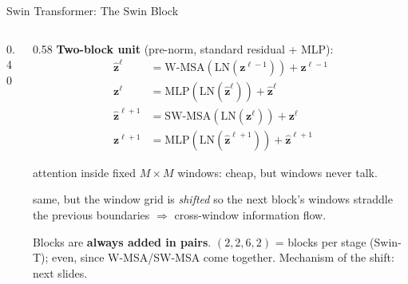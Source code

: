 \begin{frame}[fragile]{Swin Transformer: The Swin Block}
\begin{columns}[T]
\begin{column}{0.40\textwidth}
\begin{center}
      \end{center}
    \end{column}
    \begin{column}{0.58\textwidth}
      \textbf{Two-block unit} (pre-norm, standard residual + MLP):
      \begin{align*}
        \hat{\mathbf{z}}^\ell     &= \text{W-MSA}(\text{LN}(\mathbf{z}^{\ell-1})) + \mathbf{z}^{\ell-1} \\
        \mathbf{z}^\ell           &= \text{MLP}(\text{LN}(\hat{\mathbf{z}}^\ell)) + \hat{\mathbf{z}}^\ell \\
        \hat{\mathbf{z}}^{\ell+1} &= \text{SW-MSA}(\text{LN}(\mathbf{z}^\ell)) + \mathbf{z}^\ell \\
        \mathbf{z}^{\ell+1}       &= \text{MLP}(\text{LN}(\hat{\mathbf{z}}^{\ell+1})) + \hat{\mathbf{z}}^{\ell+1}
      \end{align*}

      \begin{description}[style=nextline, leftmargin=0.4cm]
        \item[W-MSA] attention inside fixed $M{\times}M$ windows: cheap, but windows never talk.
        \item[SW-MSA] same, but the window grid is \emph{shifted} so the next block's windows straddle the previous boundaries $\Rightarrow$ cross-window information flow.
      \end{description}
      Blocks are \textbf{always added in pairs}. $(2,2,6,2)$ = blocks per stage (Swin-T); even, since W-MSA/SW-MSA come together. Mechanism of the shift: next slides.
    \end{column}
  \end{columns}
\end{frame}

